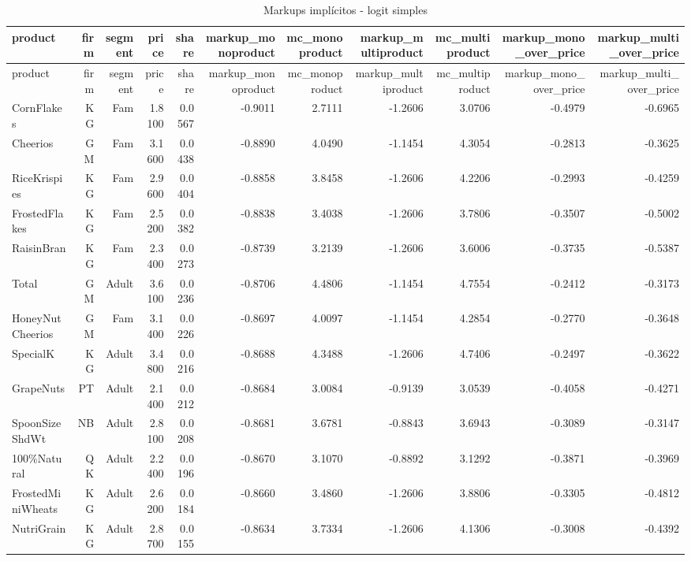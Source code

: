 \begingroup
\scriptsize
\begin{longtable}{@{}lrrrrrrrrrr@{}}
\caption{Markups implícitos - logit simples}\label{tab:markups}\\
\toprule
product & firm & segment & price & share & markup\_monoproduct & mc\_monoproduct & markup\_multiproduct & mc\_multiproduct & markup\_mono\_over\_price & markup\_multi\_over\_price \\
\midrule
\endfirsthead
\toprule
product & firm & segment & price & share & markup\_monoproduct & mc\_monoproduct & markup\_multiproduct & mc\_multiproduct & markup\_mono\_over\_price & markup\_multi\_over\_price \\
\midrule
\endhead
CornFlakes & KG & Fam & 1.8100 & 0.0567 & -0.9011 & 2.7111 & -1.2606 & 3.0706 & -0.4979 & -0.6965 \\
Cheerios & GM & Fam & 3.1600 & 0.0438 & -0.8890 & 4.0490 & -1.1454 & 4.3054 & -0.2813 & -0.3625 \\
RiceKrispies & KG & Fam & 2.9600 & 0.0404 & -0.8858 & 3.8458 & -1.2606 & 4.2206 & -0.2993 & -0.4259 \\
FrostedFlakes & KG & Fam & 2.5200 & 0.0382 & -0.8838 & 3.4038 & -1.2606 & 3.7806 & -0.3507 & -0.5002 \\
RaisinBran & KG & Fam & 2.3400 & 0.0273 & -0.8739 & 3.2139 & -1.2606 & 3.6006 & -0.3735 & -0.5387 \\
Total & GM & Adult & 3.6100 & 0.0236 & -0.8706 & 4.4806 & -1.1454 & 4.7554 & -0.2412 & -0.3173 \\
HoneyNutCheerios & GM & Fam & 3.1400 & 0.0226 & -0.8697 & 4.0097 & -1.1454 & 4.2854 & -0.2770 & -0.3648 \\
SpecialK & KG & Adult & 3.4800 & 0.0216 & -0.8688 & 4.3488 & -1.2606 & 4.7406 & -0.2497 & -0.3622 \\
GrapeNuts & PT & Adult & 2.1400 & 0.0212 & -0.8684 & 3.0084 & -0.9139 & 3.0539 & -0.4058 & -0.4271 \\
SpoonSizeShdWt & NB & Adult & 2.8100 & 0.0208 & -0.8681 & 3.6781 & -0.8843 & 3.6943 & -0.3089 & -0.3147 \\
100\%Natural & QK & Adult & 2.2400 & 0.0196 & -0.8670 & 3.1070 & -0.8892 & 3.1292 & -0.3871 & -0.3969 \\
FrostedMiniWheats & KG & Adult & 2.6200 & 0.0184 & -0.8660 & 3.4860 & -1.2606 & 3.8806 & -0.3305 & -0.4812 \\
NutriGrain & KG & Adult & 2.8700 & 0.0155 & -0.8634 & 3.7334 & -1.2606 & 4.1306 & -0.3008 & -0.4392 \\

\end{longtable}
